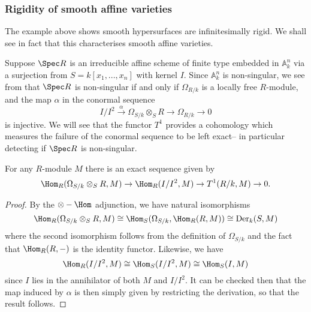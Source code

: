 \subsubsection{Rigidity of smooth affine varieties} 
The example above shows smooth hypersurfaces are infinitesimally rigid. We shall
see in fact that this characterises smooth affine varieties.  

Suppose \(\Spec R\) is an irreducible affine scheme of finite type embedded in
\(\mathbb{A}^n_k\) via a surjection from \(S=k[x_1,...,x_n]\) with kernel \(I\).
Since $\mathbb{A}^n_k$ is non-singular, we see from \cite[Theorem 8.17]{harts} that
\(\Spec R\) is non-singular if and only if \(\Omega_{R/k}\) is a locally free
\(R\)-module, and the map \(\alpha\) in the conormal sequence
\[I/I^2\overset{\alpha}{\longrightarrow}
\Omega_{S/k}\otimes_SR\to\Omega_{R/k}\longrightarrow 0\] 
is injective. We will see that the functor \(T^1\) provides a
cohomology which measures the failure of the conormal sequence to be left
exact-- in particular detecting if \(\Spec R\) is non-singular.

\begin{proposition}
    For any \(R\)-module \(M\) there is an exact sequence given by
    \[\Hom_R(\Omega_{S/k}\otimes_S R,M)\rightarrow \Hom_R(I/I^2,M) \rightarrow
    T^1(R/k,M)\rightarrow 0.\]
    \begin{proof}
        By the \(\otimes-\Hom\) adjunction, we have natural isomorphisms
        \[\Hom_R(\Omega_{S/k}\otimes_S R, M) \cong
        \Hom_S(\Omega_{S/k},\Hom_R(R,M))\cong\text{Der}_k(S,M)\]  
        where the second isomorphism follows from the definition of
        \(\Omega_{S/k}\) and the fact that \(\Hom_R(R,-)\) is the identity
        functor.  Likewise, we have 
        \[\Hom_R(I/I^2,M)\cong \Hom_S(I/I^2, M)\cong \Hom_S(I,M)\] 
        since \(I\) lies in the annihilator of both \(M\) and \(I/I^2\). It can
        be checked then that the map induced by \(\alpha\) is then simply given
        by restricting the derivation, so that the result follows.
    \end{proof}
\end{proposition}

